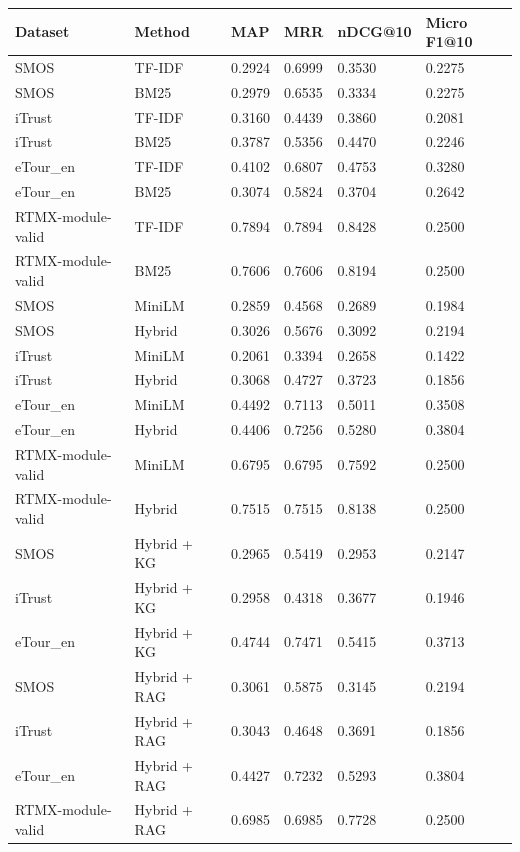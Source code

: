 \documentclass[
  11pt,
  a4paper,
]{report}
\begin{document}
\begin{longtable}[]{@{}llllll@{}}
\toprule\noalign{}
Dataset & Method & MAP & MRR & nDCG@10 & Micro F1@10 \\
\midrule\noalign{}
\endhead
\bottomrule\noalign{}
\endlastfoot
SMOS & TF-IDF & 0.2924 & 0.6999 & 0.3530 & 0.2275 \\
SMOS & BM25 & 0.2979 & 0.6535 & 0.3334 & 0.2275 \\
iTrust & TF-IDF & 0.3160 & 0.4439 & 0.3860 & 0.2081 \\
iTrust & BM25 & 0.3787 & 0.5356 & 0.4470 & 0.2246 \\
eTour\_en & TF-IDF & 0.4102 & 0.6807 & 0.4753 & 0.3280 \\
eTour\_en & BM25 & 0.3074 & 0.5824 & 0.3704 & 0.2642 \\
RTMX-module-valid & TF-IDF & 0.7894 & 0.7894 & 0.8428 & 0.2500 \\
RTMX-module-valid & BM25 & 0.7606 & 0.7606 & 0.8194 & 0.2500 \\
SMOS & MiniLM & 0.2859 & 0.4568 & 0.2689 & 0.1984 \\
SMOS & Hybrid & 0.3026 & 0.5676 & 0.3092 & 0.2194 \\
iTrust & MiniLM & 0.2061 & 0.3394 & 0.2658 & 0.1422 \\
iTrust & Hybrid & 0.3068 & 0.4727 & 0.3723 & 0.1856 \\
eTour\_en & MiniLM & 0.4492 & 0.7113 & 0.5011 & 0.3508 \\
eTour\_en & Hybrid & 0.4406 & 0.7256 & 0.5280 & 0.3804 \\
RTMX-module-valid & MiniLM & 0.6795 & 0.6795 & 0.7592 & 0.2500 \\
RTMX-module-valid & Hybrid & 0.7515 & 0.7515 & 0.8138 & 0.2500 \\
SMOS & Hybrid + KG & 0.2965 & 0.5419 & 0.2953 & 0.2147 \\
iTrust & Hybrid + KG & 0.2958 & 0.4318 & 0.3677 & 0.1946 \\
eTour\_en & Hybrid + KG & 0.4744 & 0.7471 & 0.5415 & 0.3713 \\
SMOS & Hybrid + RAG & 0.3061 & 0.5875 & 0.3145 & 0.2194 \\
iTrust & Hybrid + RAG & 0.3043 & 0.4648 & 0.3691 & 0.1856 \\
eTour\_en & Hybrid + RAG & 0.4427 & 0.7232 & 0.5293 & 0.3804 \\
RTMX-module-valid & Hybrid + RAG & 0.6985 & 0.6985 & 0.7728 & 0.2500 \\
\end{longtable}
\end{document}

